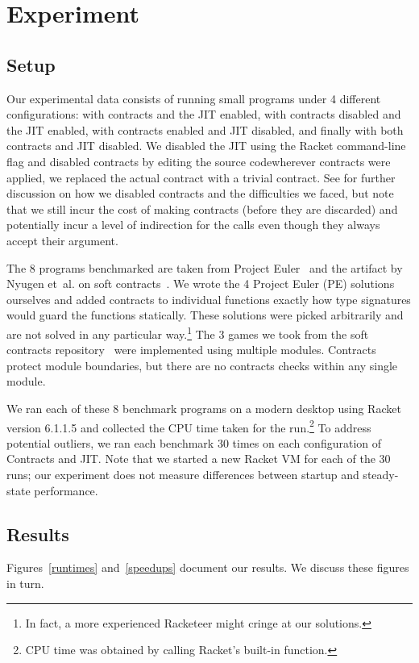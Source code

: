\section{Experiment}
\label{experiment}
\subsection{Setup}
Our experimental data consists of running small programs under 4 different configurations: with contracts and the JIT enabled, with contracts disabled and the JIT enabled, with contracts enabled and JIT disabled, and finally with both contracts and JIT disabled.
We disabled the JIT using the Racket command-line flag  and disabled contracts by editing the  source code\textemdash wherever contracts were applied, we replaced the actual contract with a trivial  contract.
See  for further discussion on how we disabled contracts and the difficulties we faced, but note that we still incur the cost of making contracts (before they are discarded) and potentially incur a level of indirection for the  calls even though they always accept their argument.

The 8 programs benchmarked are taken from Project Euler~\cite{project-euler} and the artifact by Nyugen et~al. on soft contracts~\cite{soft-contracts}.
We wrote the 4 Project Euler (PE) solutions ourselves and added contracts to individual functions exactly how type signatures would guard the functions statically.
These solutions were picked arbitrarily and are not solved in any particular way.\footnote{In fact, a more experienced Racketeer might cringe at our solutions.}
The 3 games we took from the soft contracts repository~\cite{soft-contracts-repo} were implemented using multiple modules.
Contracts protect module boundaries, but there are no contracts checks within any single module.

We ran each of these 8 benchmark programs on a modern desktop using Racket version 6.1.1.5 and collected the CPU time taken for the run.\footnote{CPU time was obtained by calling Racket's built-in  function.}
To address potential outliers, we ran each benchmark 30 times on each configuration of Contracts and JIT.
Note that we started a new Racket VM for each of the 30 runs; our experiment does not measure differences between startup and steady-state performance.

\subsection{Results}
Figures~\ref{runtimes} and~\ref{speedups} document our results.
We discuss these figures in turn.

